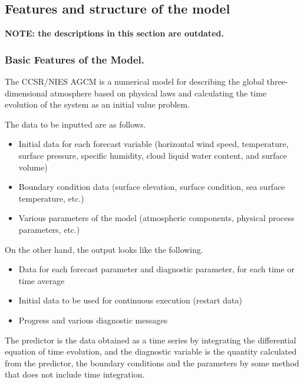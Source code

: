 \hypertarget{features-and-structure-of-the-model}{%
\subsection{Features and structure of the
model}\label{features-and-structure-of-the-model}}

\textbf{NOTE: the descriptions in this section are outdated.}

\hypertarget{basic-features-of-the-model.}{%
\subsubsection{Basic Features of the
Model.}\label{basic-features-of-the-model.}}

The CCSR/NIES AGCM is a numerical model for describing the global
three-dimensional atmosphere based on physical laws and calculating the
time evolution of the system as an initial value problem.

The data to be inputted are as follows.

\begin{itemize}
\item
  Initial data for each forecast variable (horizontal wind speed,
  temperature, surface pressure, specific humidity, cloud liquid water
  content, and surface volume)
\item
  Boundary condition data (surface elevation, surface condition, sea
  surface temperature, etc.)
\item
  Various parameters of the model (atmospheric components, physical
  process parameters, etc.)
\end{itemize}

On the other hand, the output looks like the following.

\begin{itemize}
\item
  Data for each forecast parameter and diagnostic parameter, for each
  time or time average
\item
  Initial data to be used for continuous execution (restart data)
\item
  Progress and various diagnostic messages
\end{itemize}

The predictor is the data obtained as a time series by integrating the
differential equation of time evolution, and the diagnostic variable is
the quantity calculated from the predictor, the boundary conditions and
the parameters by some method that does not include time integration.

